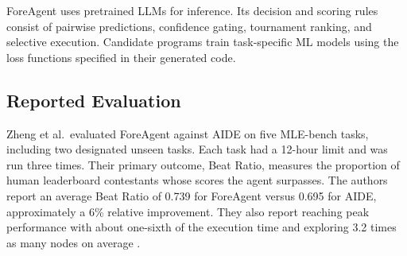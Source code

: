 ForeAgent uses pretrained LLMs for inference. Its decision and scoring rules consist of pairwise predictions, confidence gating, tournament ranking, and selective execution. Candidate programs train task-specific ML models using the loss functions specified in their generated code.

\subsection{Reported Evaluation}
Zheng et al.\ evaluated ForeAgent against AIDE on five MLE-bench tasks, including two designated unseen tasks. Each task had a 12-hour limit and was run three times. Their primary outcome, Beat Ratio, measures the proportion of human leaderboard contestants whose scores the agent surpasses. The authors report an average Beat Ratio of 0.739 for ForeAgent versus 0.695 for AIDE, approximately a 6\% relative improvement. They also report reaching peak performance with about one-sixth of the execution time and exploring 3.2 times as many nodes on average \citep[Sections~6.3--6.4]{zheng2026predict}.
